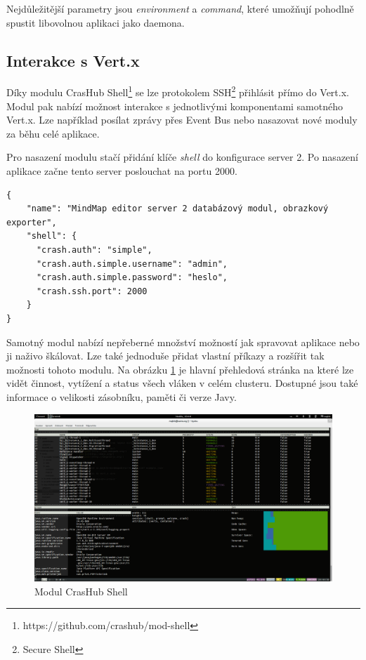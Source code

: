 Nejdůležitější parametry jsou \emph{environment} a \emph{command}, které umožňují pohodlně spustit libovolnou aplikaci jako daemona.

\subsection{Interakce s Vert.x}\label{sub:interaction}

Díky modulu CrasHub Shell\footnote{https://github.com/crashub/mod-shell} se lze protokolem SSH\footnote{Secure Shell} přihlásit přímo do Vert.x. Modul pak nabízí možnost interakce s jednotlivými komponentami samotného Vert.x. Lze například posílat zprávy přes Event Bus nebo nasazovat nové moduly za běhu celé aplikace.

Pro nasazení modulu stačí přidání klíče \emph{shell} do konfigurace server 2. Po nasazení aplikace začne tento server poslouchat na portu 2000.

\begin{lstlisting}[caption={Konfigurace modulu CrasHub Shell},label=confServ2]
{
    "name": "MindMap editor server 2 databázový modul, obrazkový exporter",
    "shell": {
      "crash.auth": "simple",
      "crash.auth.simple.username": "admin",
      "crash.auth.simple.password": "heslo",
      "crash.ssh.port": 2000
    }
}
\end{lstlisting}

Samotný modul nabízí nepřeberné množství možností jak spravovat aplikace nebo ji naživo škálovat. Lze také jednoduše přidat vlastní příkazy a rozšířit tak možnosti tohoto modulu. Na obrázku \ref{fig:real_interaction} je hlavní přehledová stránka na které lze vidět činnost, vytížení a status všech vláken v celém clusteru. Dostupné jsou také informace o velikosti zásobníku, paměti či verze Javy. 

\begin{figure}
\begin{centering}
\includegraphics[scale=0.21]{obrazky/real_interaction}
\par\end{centering}
\caption{Modul CrasHub Shell\label{fig:real_interaction}}
\end{figure}

